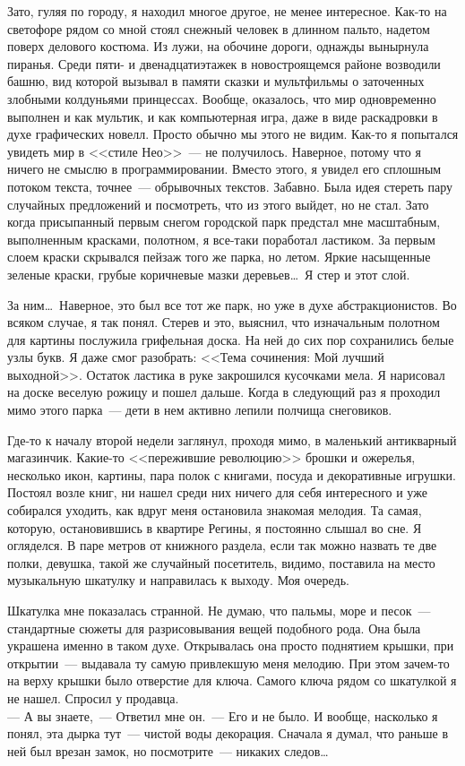 Зато, гуляя по городу, я находил многое другое, не менее интересное. Как-то на 
светофоре рядом со мной стоял снежный человек в длинном пальто, надетом поверх 
делового костюма. Из лужи, на обочине дороги, однажды вынырнула пиранья. Среди 
пяти- и двенадцатиэтажек в новостроящемся районе возводили башню, вид которой 
вызывал в памяти сказки и мультфильмы о заточенных злобными колдуньями 
принцессах. Вообще, оказалось, что мир одновременно выполнен и как мультик, и 
как компьютерная игра, даже в виде раскадровки в духе графических новелл. 
Просто обычно мы этого не видим. Как-то я попытался увидеть мир в <<стиле Нео>>~--- не 
получилось. Наверное, потому что я ничего не смыслю в программировании. Вместо 
этого, я увидел его сплошным потоком текста, точнее~--- обрывочных текстов. 
Забавно. Была идея стереть пару случайных предложений и посмотреть, что из 
этого выйдет, но не стал. Зато когда присыпанный первым снегом городской парк 
предстал мне масштабным, выполненным красками, полотном, я все-таки поработал ластиком. 
За первым слоем краски скрывался пейзаж того же парка, но летом. Яркие 
насыщенные зеленые краски, грубые коричневые мазки деревьев\ldots\ Я стер и 
этот слой.
 
За ним\ldots\ Наверное, это был все тот же парк, но уже в духе 
абстракционистов. Во всяком случае, я так понял. Стерев и это, выяснил, что изначальным полотном для 
картины послужила грифельная доска. На ней до сих пор сохранились белые узлы 
букв. Я даже смог разобрать: <<Тема сочинения: Мой лучший выходной>>. Остаток 
ластика в руке закрошился кусочками мела. Я нарисовал на доске веселую рожицу и 
пошел дальше. Когда в следующий раз я проходил мимо этого парка~--- дети в нем 
активно лепили полчища снеговиков.

Где-то к началу второй недели заглянул, проходя мимо, в маленький антикварный 
магазинчик. Какие-то <<пережившие революцию>> брошки и ожерелья, несколько 
икон, картины, пара полок с книгами, посуда и декоративные игрушки. Постоял возле 
книг, ни нашел среди них ничего для себя интересного и уже собирался уходить, 
как вдруг меня остановила знакомая мелодия. Та самая, которую, остановившись в 
квартире Регины, я постоянно слышал во сне. Я огляделся. В паре метров от 
книжного раздела, если так можно назвать те две полки, девушка, такой же 
случайный посетитель, видимо, поставила на место музыкальную шкатулку и 
направилась к выходу. Моя очередь.

Шкатулка мне показалась странной. Не думаю, что пальмы, море и песок~--- 
стандартные сюжеты для разрисовывания вещей подобного рода. Она была украшена 
именно в таком духе. Открывалась она просто поднятием крышки, при открытии~--- 
выдавала ту самую привлекшую меня мелодию. При этом зачем-то на верху крышки 
было отверстие для ключа. Самого ключа рядом со шкатулкой я не нашел. Спросил у 
продавца.\\
--- А вы знаете,~--- Ответил мне он.~--- Его и не было. И вообще, насколько я 
понял, эта дырка тут~--- чистой воды декорация. Сначала я думал, что раньше в ней был 
врезан замок, но посмотрите~--- никаких следов\ldots

